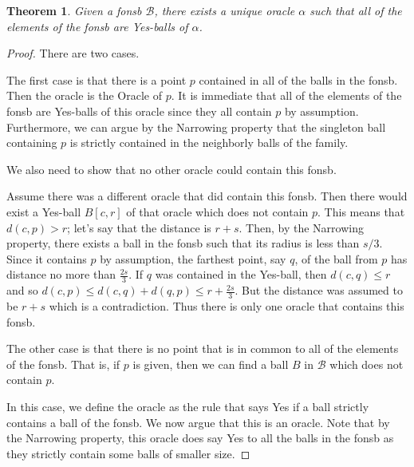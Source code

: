 \documentclass[12pt]{article}
\newtheorem{theorem}{Theorem}[section]
\begin{document}
\begin{theorem}
    Given a fonsb $\mathcal{B}$, there exists a unique oracle $\alpha$ such that all of the elements of the fonsb are Yes-balls of $\alpha$.
\end{theorem}

\begin{proof}
    There are two cases. 
    
    The first case is that there is a point $p$ contained in all of the balls in the fonsb. Then the oracle is the Oracle of $p$. It is immediate that all of the elements of the fonsb are Yes-balls of this oracle since they all contain $p$ by assumption. Furthermore, we can argue by the Narrowing property that the singleton ball containing $p$ is strictly contained in the neighborly balls of the family. 
    
    We also need to show that no other oracle could contain this fonsb.

    Assume there was a different oracle that did contain this fonsb. Then there would exist a Yes-ball $B[c,r]$ of that oracle which does not contain $p$. This means that $d(c,p) > r$; let's say that the distance is $r +s$. Then, by the Narrowing property, there exists a ball in the fonsb such that its radius is less than $s/3$. Since it contains $p$ by assumption, the farthest point, say $q$, of the ball from $p$ has distance no more than $\frac{2s}{3}$. If $q$ was contained in the Yes-ball, then $d(c,q)  \leq r$ and so $d(c, p) \leq d(c, q) + d(q,p) \leq r + \frac{2s}{3}$. But the distance was assumed to be  $r + s$ which is a contradiction. Thus there is only one oracle that contains this fonsb. 

    The other case is that there is no point that is in common to all of the elements of the fonsb. That is, if $p$ is given, then we can find a ball $B$ in $\mathcal{B}$ which does not contain $p$. 

    In this case, we define the oracle as the rule that says Yes if a ball strictly contains a ball of the fonsb. We now argue that this is an oracle. Note that by the Narrowing property, this oracle does say Yes to all the balls in the fonsb as they strictly contain some balls of smaller size.


\end{proof}
\end{document}

